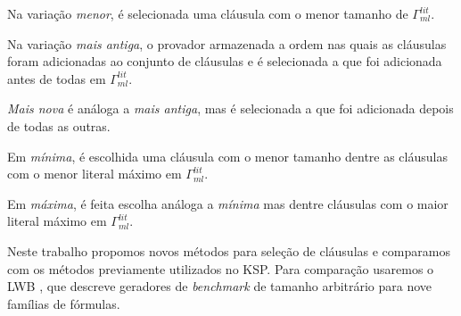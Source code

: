 Na variação \textit{menor}, é selecionada uma cláusula com o menor tamanho de $\Gamma^{lit}_{ml}$.

Na variação \textit{mais antiga}, o provador armazenada a ordem nas quais as cláusulas foram adicionadas ao conjunto de cláusulas e é selecionada a que foi adicionada antes de todas em $\Gamma^{lit}_{ml}$.

\textit{Mais nova} é análoga a \textit{mais antiga}, mas é selecionada a que foi adicionada depois de todas as outras.

Em \textit{mínima}, é escolhida uma cláusula com o menor tamanho dentre as cláusulas com o menor literal máximo em $\Gamma^{lit}_{ml}$.

Em \textit{máxima}, é feita escolha análoga a \textit{mínima} mas dentre cláusulas com o maior literal máximo em $\Gamma^{lit}_{ml}$.

Neste trabalho propomos novos métodos para seleção de cláusulas e comparamos com os métodos previamente utilizados no KSP. Para comparação usaremos o LWB \cite{lwb}, que descreve geradores de \textit{benchmark} de tamanho arbitrário para nove famílias de fórmulas.



